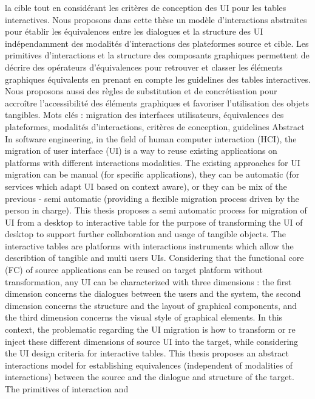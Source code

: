 \documentclass{article}
\begin{document}
la cible tout en consid\'{e}rant les crit\`{e}res de conception des UI pour les tables interactives.
Nous proposons dans cette th\`{e}se un mod\`{e}le d’interactions abstraites pour \'{e}tablir les \'{e}quivalences entre les
dialogues et la structure des UI ind\'{e}pendamment des modalit\'{e}s d’interactions des plateformes source et cible.
Les primitives d’interactions et la structure des composants graphiques permettent de d\'{e}crire des op\'{e}rateurs
d’\'{e}quivalences pour retrouver et classer les \'{e}l\'{e}ments graphiques \'{e}quivalents en prenant en compte les guidelines des tables interactives. Nous proposons aussi des r\`{e}gles de substitution et de concr\'{e}tisation pour accro\^{i}tre
l’accessibilit\'{e} des \'{e}l\'{e}ments graphiques et favoriser l’utilisation des objets tangibles.
Mots cl\'{e}s :
migration des interfaces utilisateurs, \'{e}quivalences des plateformes, modalit\'{e}s d’interactions,
crit\`{e}res de conception, guidelines
Abstract
In software engineering, in the ﬁeld of human computer interaction (HCI), the migration of user interface
(UI) is a way to reuse existing applications on platforms with different interactions modalities. The existing
approaches for UI migration can be manual (for speciﬁc applications), they can be automatic (for services
which adapt UI based on context aware), or they can be mix of the previous - semi automatic (providing a
ﬂexible migration process driven by the person in charge).
This thesis proposes a semi automatic process for migration of UI from a desktop to interactive table for the
purpose of transforming the UI of desktop to support further collaboration and usage of tangible objects. The
interactive tables are platforms with interactions instruments which allow the describtion of tangible and multi
users UIs. Considering that the functional core (FC) of source applications can be reused on target platform
without transformation, any UI can be characterized with three dimensions : the ﬁrst dimension concerns the
dialogues between the users and the system, the second dimension concerns the structure and the layout of
graphical components, and the third dimension concerns the visual style of graphical elements. In this context,
the problematic regarding the UI migration is how to transform or re inject these different dimensions of source
UI into the target, while considering the UI design criteria for interactive tables.
This thesis proposes an abstract interactions model for establishing equivalences (independent of modalities
of interactions) between the source and the dialogue and structure of the target. The primitives of interaction and
\end{document}
